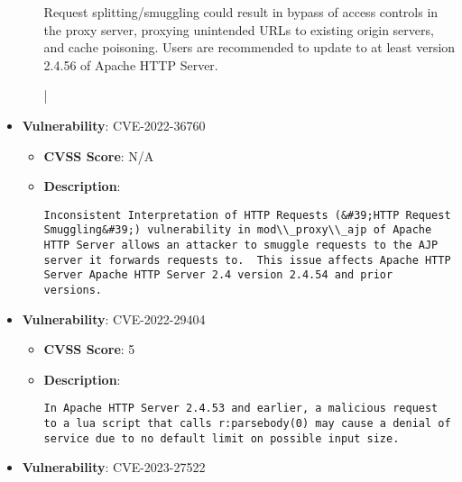 \documentclass{article}
\begin{document}
\begin{itemize}
\begin{itemize}
{Request splitting/smuggling could result in bypass of access controls in the proxy server, proxying unintended URLs to existing origin servers, and cache poisoning. Users are recommended to update to at least version 2.4.56 of Apache HTTP Server.


|
            }
        \end{itemize}
    
        \item \textbf{Vulnerability}: CVE-2022-36760
        \begin{itemize}
            \item \textbf{CVSS Score}:  N/A 
            \item \textbf{Description}:
            \parbox[t]{0.9\linewidth}{
                \verb|Inconsistent Interpretation of HTTP Requests (&#39;HTTP Request Smuggling&#39;) vulnerability in mod\\_proxy\\_ajp of Apache HTTP Server allows an attacker to smuggle requests to the AJP server it forwards requests to.  This issue affects Apache HTTP Server Apache HTTP Server 2.4 version 2.4.54 and prior versions.|
            }
        \end{itemize}
    
        \item \textbf{Vulnerability}: CVE-2022-29404
        \begin{itemize}
            \item \textbf{CVSS Score}:  5 
            \item \textbf{Description}:
            \parbox[t]{0.9\linewidth}{
                \verb|In Apache HTTP Server 2.4.53 and earlier, a malicious request to a lua script that calls r:parsebody(0) may cause a denial of service due to no default limit on possible input size.|
            }
        \end{itemize}
    
        \item \textbf{Vulnerability}: CVE-2023-27522
\end{itemize}
\end{document}
